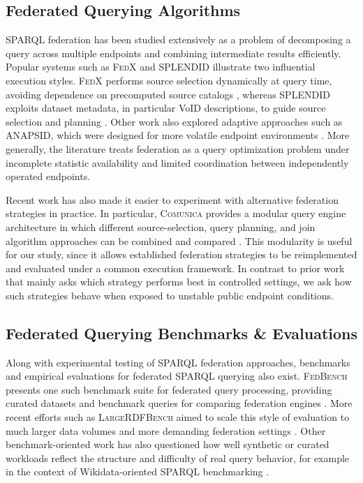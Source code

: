\documentclass[runningheads]{llncs}
\begin{document}
\subsection{Federated Querying Algorithms}\label{sec2.1}
SPARQL federation has been studied extensively as a problem of decomposing a query across multiple endpoints and combining intermediate results efficiently. 
Popular systems such as \textsc{FedX} and \textsc{SPLENDID} illustrate two influential execution styles. 
\textsc{FedX} performs source selection dynamically at query time, avoiding dependence on precomputed source catalogs \cite{Schwarte2011FedX}, whereas \textsc{SPLENDID} exploits dataset metadata, in particular VoID descriptions, to guide source selection and planning \cite{Gorlitz2011SPLENDID}. 
Other work also explored adaptive approaches such as \textsc{ANAPSID}, which were designed for more volatile endpoint environments \cite{Acosta2011Federating}. 
More generally, the literature treats federation as a query optimization problem under incomplete statistic availability and limited coordination between independently operated endpoints.

Recent work has also made it easier to experiment with alternative federation strategies in practice. 
In particular, \textsc{Comunica} provides a modular query engine architecture in which different source-selection, query planning, and join algorithm approaches can be combined and compared \cite{Taelman2018Comunica}. 
This modularity is useful for our study, since it allows established federation strategies to be reimplemented and evaluated under a common execution framework. 
In contrast to prior work that mainly asks which strategy performs best in controlled settings, we ask how such strategies behave when exposed to unstable public endpoint conditions.

\subsection{Federated Querying Benchmarks \& Evaluations}\label{sec2.2}
Along with experimental testing of SPARQL federation approaches, benchmarks and empirical evaluations for federated SPARQL querying also exist. 
\textsc{FedBench} presents one such benchmark suite for federated query processing, providing curated datasets and benchmark queries for comparing federation engines \cite{Schmidt2011FedBench,Saleem2014FedBench}. 
More recent efforts such as \textsc{LargeRDFBench} aimed to scale this style of evaluation to much larger data volumes and more demanding federation settings \cite{Saleem2018LargeRDFBench}. 
Other benchmark-oriented work has also questioned how well synthetic or curated workloads reflect the structure and difficulty of real query behavior, for example in the context of Wikidata-oriented SPARQL benchmarking \cite{Hernandez2015Wikidata}.
\end{document}
